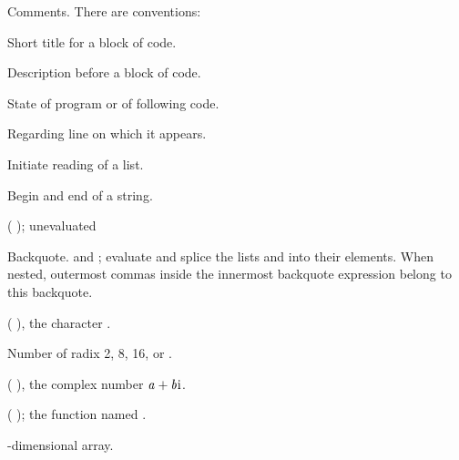 \begin{LIST}{1cm}

  {
  Comments. There are conventions:
  }
  \begin{LIST}{.5cm}
    {Short title for a block of code.}

    {Description before a block of code.}

    {State of program or of following code.}

    {Regarding line on which it appears.}

  \end{LIST}

  \IT{\KWD*{(}\qquad\quad}
  {
  Initiate reading of a list.
  }

  {
  Begin and end of a string.
  }

  {
  ( );  unevaluated
  }

  {
  Backquote.   and ; evaluate 
  and splice the lists  and  into their
  elements. When nested, outermost commas inside the innermost
  backquote expression belong to this backquote.
  }

  {
  ( ), the character .
  }

  {
  Number of radix 2, 8, 16, or . 
  }

  {
    (  ), the complex number $\VAR{a}+\VAR{b}\text{i}$.
  }

  {
  ( ); the function named .
  }

  {
  -dimensional array.
  }


\end{LIST}
